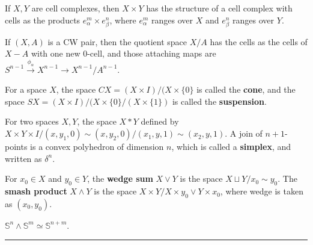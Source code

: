 \begin{defn} If $X,Y$ are cell complexes, then $X\times Y$ has the structure of a cell complex with cells as the products $e_\alpha^m\times e_\beta^n$, where $e_\alpha^m$ ranges over $X$ and $e_\beta^n$ ranges over $Y$.
\end{defn}

\begin{defn} If $(X,A)$ is a CW pair, then the quotient space $X/A$ has the cells as the cells of $X-A$ with one new 0-cell, and those attaching maps are $S^{n-1}\xrightarrow{\phi_\alpha}X^{n-1}\rightarrow X^{n-1}/A^{n-1}$.
\end{defn}

\begin{defn} For a space $X$, the space $CX=(X\times I)/(X\times \{0\}$ is called the \textbf{cone}, and the space $SX=(X\times I)/(X\times \{0\}/(X\times \{1\})$ is called the \textbf{suspension}.
\end{defn}

\begin{defn} For two spaces $X,Y$, the space $X*Y$ defined by $X\times Y\times I/(x,y_1,0)\sim (x,y_2,0)/(x_1,y,1)\sim (x_2,y,1)$. A join of $n+1$-points is a convex polyhedron of dimension $n$, which is called a \textbf{simplex}, and written as $\delta^{n}$.
\end{defn}

\begin{defn} For $x_0\in X$ and $y_0\in Y$, the \textbf{wedge sum} $X\vee Y$ is the space $X\sqcup Y/x_0\sim y_0$. The \textbf{smash product} $X\wedge Y$ is the space $X\times Y/X\times {y_0}\vee Y\times {x_0}$, where wedge is taken as $(x_0,y_0)$.
\end{defn}
\begin{exmp} $\mathbb{S}^n\wedge \mathbb{S}^m\simeq \mathbb{S}^{n+m}$.
\end{exmp}

\noindent\rule{\textwidth}{1pt}
\newline
